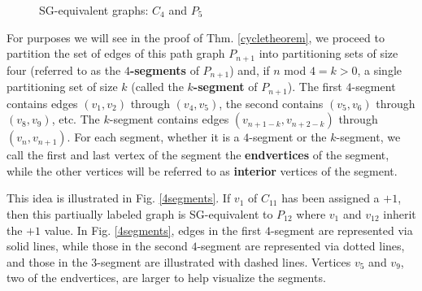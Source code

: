 \documentclass[amsart,11pt]{article}
\theoremstyle{dotless}
\theoremstyle{dotless}
\begin{document}
\begin{figure}[htb]  
\centering  

\hspace{50pt}

\caption{SG-equivalent graphs: $C_4$ and $P_5$}
\label{cycleSG}
\end{figure}




For purposes we will see in the proof of Thm. \ref{cycletheorem}, we proceed to partition the set of edges of this path graph $P_{n+1}$ into partitioning sets of size four (referred to as the \textbf{$4$-segments} of $P_{n+1}$) and, if $n$ mod $4 = k > 0$, a single partitioning set of size $k$ (called the \textbf{$k$-segment} of $P_{n+1}$). The first $4$-segment contains edges $(v_1,v_2)$ through $(v_4,v_5)$, the second contains $(v_5,v_6)$ through $(v_8,v_9)$, etc. The $k$-segment contains edges $(v_{n+1-k},v_{n+2-k})$ through $(v_{n},v_{n+1})$. For each segment, whether it is a $4$-segment or the $k$-segment, we call the first and last vertex of the segment the \textbf{endvertices} of the segment, while the other vertices will be referred to as \textbf{interior} vertices of the segment.

This idea is illustrated in Fig. \ref{4segments}. If $v_1$ of $C_{11}$ has been assigned a $+1$, then this partiually labeled graph is SG-equivalent to $P_{12}$ where $v_1$ and $v_{12}$ inherit the $+1$ value. In Fig. \ref{4segments}, edges in the first $4$-segment are represented via solid lines, while those in the second $4$-segment are represented via dotted lines, and those in the $3$-segment are illustrated with dashed lines. Vertices $v_5$ and $v_9$, two of the endvertices, are larger to help visualize the segments.\\
\end{document}
